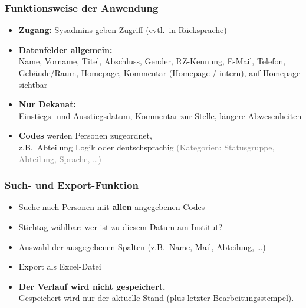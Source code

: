 \documentclass{beamer}
\begin{document}
\begin{frame}[t]
  \frametitle{Funktionsweise der Anwendung}

  \begin{itemize}
    \item[\faKey] \textbf{Zugang:} Sysadmins geben Zugriff (evtl.\ in R\"ucksprache)
    \medskip
    \item[\faUser] \textbf{Datenfelder allgemein:}\\
      {\small Name, Vorname, Titel, Abschluss, Gender, RZ-Kennung,
       E-Mail, Telefon, Geb\"aude/Raum, Homepage, Kommentar (Homepage / intern),
       \glqq auf Homepage sichtbar\grqq}
    \medskip
    \item[\faLock] \textbf{Nur Dekanat:}\\
      {\small Einstiegs- und Ausstiegsdatum, Kommentar zur Stelle,
       l\"angere Abwesenheiten}
    \medskip
    \item[\faTags] \textbf{\glqq Codes\grqq} werden Personen zugeordnet,\\
      {\small z.B.\ \glqq Abteilung Logik\grqq{} oder \glqq deutschsprachig\grqq{}
       \quad \textcolor{gray}{(Kategorien: Statusgruppe, Abteilung, Sprache, \dots)}}
  \end{itemize}
\end{frame}

\begin{frame}[t]
  \frametitle{Such- und Export-Funktion}

  \begin{itemize}
    \setlength{\itemsep}{6pt}
    \item[\faSearch] Suche nach Personen mit \textbf{allen} angegebenen Codes
    \item[\faCalendar] Stichtag w\"ahlbar: wer ist zu diesem Datum am Institut?
    \item[\faTable] Auswahl der ausgegebenen Spalten (z.B.\ Name, Mail, Abteilung, \dots)
    \item[\faFileExcel] Export als Excel-Datei
    \item[\textcolor{middle_red}{\faExclamationTriangle}] \textbf{Der Verlauf wird nicht gespeichert.}\\
      {\small Gespeichert wird nur der aktuelle Stand (plus letzter Bearbeitungsstempel).}
  \end{itemize}
\end{frame}
\end{document}
